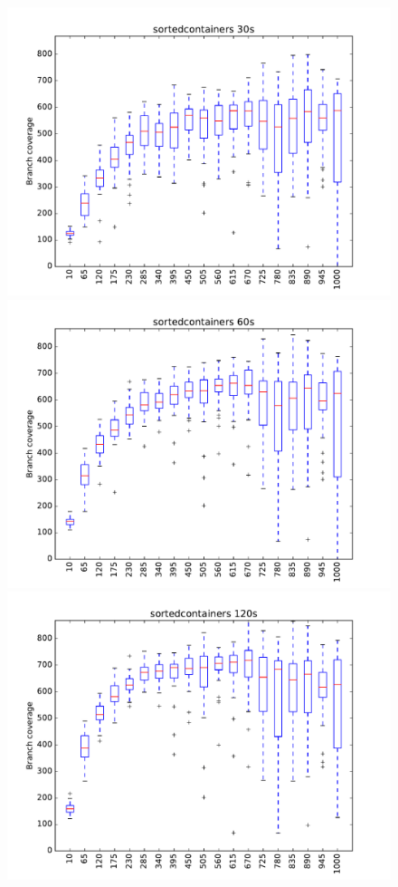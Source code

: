 \begin{figure}
\includegraphics[width=\columnwidth]{graphs/sortedcontainersrand30}
\includegraphics[width=\columnwidth]{graphs/sortedcontainersrand60}
\includegraphics[width=\columnwidth]{graphs/sortedcontainersrand120}
\end{figure}

